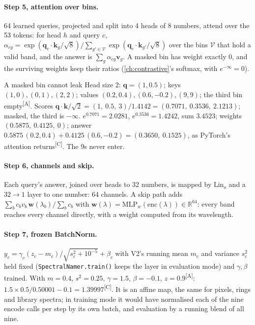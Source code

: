 \documentclass[11pt,a4paper,oneside,openany]{book}
\newcommand{\B}[1]{{\symbf{#1}}}
\newcommand{\B}[1]{{\bm{#1}}}
\newcommand{\comp}{\textsuperscript{\textsf{\scriptsize[C]}}}
\newcommand{\assm}{\textsuperscript{\textsf{\scriptsize[A]}}}
\newcommand{\R}{\mathbb{R}}
\newcommand{\vv}{\B{v}}
\newcommand{\vw}{\B{w}}
\newcommand{\vq}{\B{q}}
\begin{document}
\paragraph{Step 5, attention over bins.} 64 learned queries, projected and split into 4 heads of 8 numbers, attend over the 53 tokens: for head $h$ and query $c$,
$\alpha_{cg}=\exp(\vq_c\cdot\B{k}_g/\sqrt8)\big/\sum_{g'\in\mathcal V}\exp(\vq_c\cdot\B{k}_{g'}/\sqrt8)$ over the bins $\mathcal V$ that hold a valid band, and the answer is
$\sum_g\alpha_{cg}\vv_g$. A masked bin has weight exactly 0, and the surviving weights keep their ratios (\cref{ch:contrastive}'s softmax, with $e^{-\infty}=0$).

\begin{worked}[label=we:asbuilt:attn]{A masked bin cannot leak}
Head size 2: $\vq=(1,0.5)$; keys $(1,0),(0,1),(2,2)$; values $(0.2,0.4),(0.6,-0.2),(9,9)$; the third bin empty\assm. Scores $\vq\cdot\B{k}/\sqrt2=(1,\ 0.5,\ 3)/1.4142
=(0.7071,\ 0.3536,\ 2.1213)$; masked, the third is $-\infty$. $e^{0.7071}=2.0281$, $e^{0.3536}=1.4242$, sum $3.4523$; weights $(0.5875,\ 0.4125,\ 0)$; answer
$0.5875\,(0.2,0.4)+0.4125\,(0.6,-0.2)=(0.3650,\ 0.1525)$, as PyTorch's attention returns\comp. The 9s never enter.
\end{worked}

\paragraph{Step 6, channels and skip.} Each query's answer, joined over heads to 32 numbers, is mapped by $\mathrm{Lin}_o$ and a $32\to1$ layer to one number: 64 channels. A
skip path adds $\sum_bc_bv_b\,\vw(\lambda_b)/\sum_bc_b$ with $\vw(\lambda)=\mathrm{MLP}_w(\mathrm{enc}(\lambda))\in\R^{64}$: every band reaches every channel directly, with
a weight computed from its wavelength.

\paragraph{Step 7, frozen BatchNorm.} $y_c=\gamma_c(z_c-m_c)/\sqrt{s_c^2+10^{-5}}+\beta_c$ with V2's running mean $m_c$ and variance $s_c^2$ held fixed
(\texttt{SpectralNamer.train()} keeps the layer in evaluation mode) and $\gamma,\beta$ trained. With $m=0.4$, $s^2=0.25$, $\gamma=1.5$, $\beta=-0.1$, $z=0.9$\assm:
$1.5\times0.5/0.50001-0.1=1.39997$\comp. It is an affine map, the same for pixels, rings and library spectra; in training mode it would have normalised each of the nine
encode calls per step by its own batch, and evaluation by a running blend of all nine.
\end{document}
